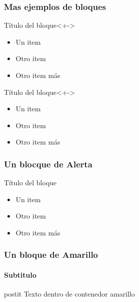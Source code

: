 \documentclass{beamer}
\begin{document}
   \begin{frame}
   \frametitle{Mas ejemplos de bloques} 
   \begin{exampleblock}{Título del bloque}<+->
      \begin{itemize}
      \item Un item
      \item Otro item
      \item Otro item más
      \end{itemize}
   \end{exampleblock}

   \begin{exampleblock}{Título del bloque}<+->
      \begin{itemize}
      \item<+-> Un item
      \item<+-> Otro item
      \item<+-> Otro item más
      \end{itemize}
   \end{exampleblock}
   \end{frame}


  \begin{frame}
    \frametitle{Un blocque de Alerta} 
    \begin{alertblock}{Título del bloque}
      \begin{itemize}
        \item Un item
        \item Otro item
        \item Otro item más
      \end{itemize}
    \end{alertblock}
  \end{frame}


  \begin{frame}
    \frametitle{Un bloque de Amarillo} 
    \framesubtitle{Subtitulo}
    \begin{beamercolorbox}{postit}
      Texto dentro de contenedor amarillo
    \end{beamercolorbox}
  \end{frame}

\end{document}
